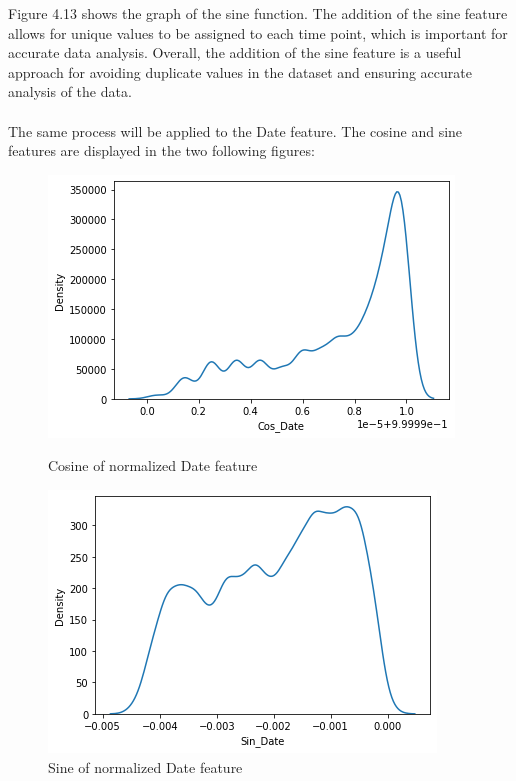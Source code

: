 \documentclass{report}
\begin{document}
\hfill \break 
Figure 4.13 shows the graph of the sine function. The addition of the sine feature allows for unique values to be assigned to each time point, which is important for accurate data analysis. Overall, the addition of the sine feature is a useful approach for avoiding duplicate values in the dataset and ensuring accurate analysis of the data.\\
\\
The same process will be applied to the Date feature. The cosine and sine features are displayed in the two following figures:\hfill \break 
\\
\begin{figure}[h!]
  \centering
  \begin{minipage}[b]{0.45\textwidth}
    \includegraphics[width=\textwidth]{cs.png}
    \caption{Cosine of normalized Date feature}
  \end{minipage}
  \hfill
  \begin{minipage}[b]{0.45\textwidth}
    \includegraphics[width=\textwidth]{sn.png}
    \caption{Sine of normalized Date feature}
  \end{minipage}
\end{figure}\break
\end{document}
